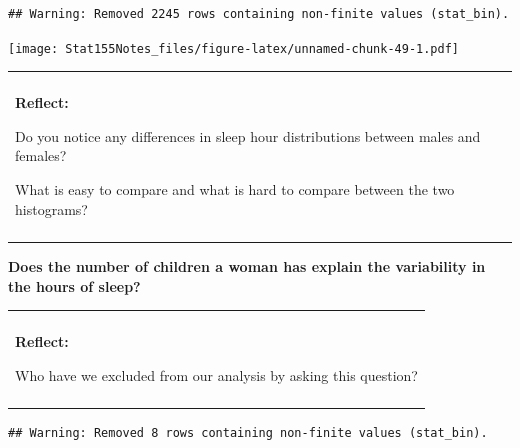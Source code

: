 \documentclass[]{book}
\newenvironment{Shaded}{\begin{snugshade}}{\end{snugshade}}
\newcommand{\DataTypeTok}[1]{\textcolor[rgb]{0.13,0.29,0.53}{#1}}
\newcommand{\DecValTok}[1]{\textcolor[rgb]{0.00,0.00,0.81}{#1}}
\newcommand{\KeywordTok}[1]{\textcolor[rgb]{0.13,0.29,0.53}{\textbf{#1}}}
\newcommand{\NormalTok}[1]{#1}
\newcommand{\OperatorTok}[1]{\textcolor[rgb]{0.81,0.36,0.00}{\textbf{#1}}}
\newcommand{\StringTok}[1]{\textcolor[rgb]{0.31,0.60,0.02}{#1}}
\newenvironment{reflect}
{
    \begin{center}
    
    \begin{tabular}{|p{0.8\textwidth}|}
    \rowcolor{LightBlue}
    \hline\\
    \rowcolor{LightBlue}
    \textbf{Reflect:}
}
{
    \\\rowcolor{LightBlue}
    \\\hline
    \end{tabular} 
    \end{center}
}
\begin{document}
\begin{verbatim}
## Warning: Removed 2245 rows containing non-finite values (stat_bin).
\end{verbatim}

\texttt{[image: Stat155Notes\_files/figure-latex/unnamed-chunk-49-1.pdf]}

\begin{reflect}
Do you notice any differences in sleep hour distributions between males
and females?

What is easy to compare and what is hard to compare between the two
histograms?
\end{reflect}

\textbf{Does the number of children a woman has explain the variability in the hours of sleep?}

\begin{reflect}
Who have we excluded from our analysis by asking this question?
\end{reflect}

\begin{Shaded}
\end{Shaded}

\begin{verbatim}
## Warning: Removed 8 rows containing non-finite values (stat_bin).
\end{verbatim}
\end{document}
